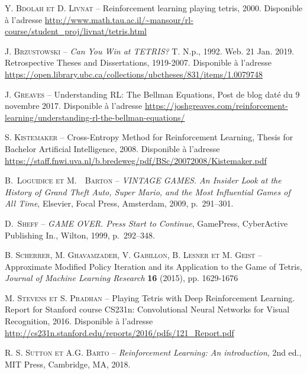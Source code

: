 \begin{thebibliography}{}

{\scshape Y. Bdolah et D. Livnat} -- Reinforcement learning playing tetris,  2000. Disponible à l'adresse \url{http://www.math.tau.ac.il/~mansour/rl-course/student_proj/livnat/tetris.html}

{\scshape J. Brzustowski} -- \textit{Can You Win at TETRIS?} T. N.p., 1992. Web. 21 Jan. 2019. Retrospective Theses and Dissertations, 1919-2007. Disponible à l'adresse \url{https://open.library.ubc.ca/collections/ubctheses/831/items/1.0079748}

\bibitem{}
{\scshape J. Greaves} -- Understanding RL: The Bellman Equations, Post de blog daté du 9 novembre 2017. Disponible à l'adresse \url{https://joshgreaves.com/reinforcement-learning/understanding-rl-the-bellman-equations/}

\bibitem{}
{\scshape S. Kistemaker} -- Cross-Entropy Method for Reinforcement Learning, Thesis for Bachelor Artificial Intelligence, 2008. Disponible à l'adresse \url{https://staff.fnwi.uva.nl/b.bredeweg/pdf/BSc/20072008/Kistemaker.pdf}

{\scshape B.~{Loguidice} et M.~~{Barton}} -- \textit{{VINTAGE GAMES. An  Insider Look  at the History of Grand Theft Auto, Super Mario, and the Most Influential Games of All Time}}, Elsevier, Focal Press, Amsterdam, 2009, p.~291--301.

\bibitem{}
{\scshape D.~{Sheff}} -- \textit{{GAME OVER. Press Start to Continue}}, GamePress, CyberActive Publishing In., Wilton, 1999, p.~292--348.

\bibitem{}
{\scshape B. Scherrer, M. Ghavamzadeh, V. Gabillon, B. Lesner et M. Geist} -- Approximate Modified Policy Iteration and its Application to the Game of Tetris, \textit{Journal of Machine Learning Research} \textbf{16} (2015), pp. 1629-1676

\bibitem{}
{\scshape M. Stevens et S. Pradhan} -- Playing Tetris with Deep Reinforcement Learning. Report for Stanford course CS231n: Convolutional Neural Networks for Visual Recognition, 2016. Disponible à l'adresse \url{http://cs231n.stanford.edu/reports/2016/pdfs/121_Report.pdf}

\bibitem{}
{\scshape R. S. Sutton et A.G. Barto} -- \textit{{Reinforcement Learning: An introduction}}, 2nd ed., MIT Press, Cambridge, MA, 2018.

\end{thebibliography}